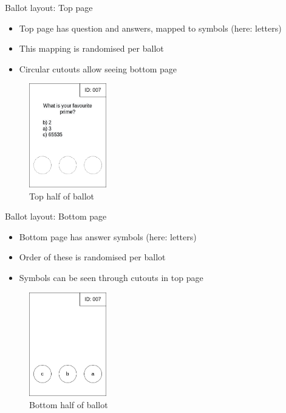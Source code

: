 \documentclass{beamer}
\begin{document}
\begin{frame}{Ballot layout: Top page}
	\begin{itemize}
		\item Top page has question and answers, mapped to symbols (here: letters)
		\item This mapping is randomised per ballot
		\item Circular cutouts allow seeing bottom page
	\end{itemize}
	\begin{figure}
		\centering
		\includegraphics[width=0.3\textwidth]{../resources/high_level_ballot_top.drawio.png}
		\caption{Top half of ballot}
	\end{figure}
\end{frame}

\begin{frame}{Ballot layout: Bottom page}
	\begin{itemize}
		\item Bottom page has answer symbols (here: letters)
		\item Order of these is randomised per ballot
		\item Symbols can be seen through cutouts in top page
	\end{itemize}
	\begin{figure}
		\centering
		\includegraphics[width=0.3\textwidth]{../resources/high_level_ballot_bottom.drawio.png}
		\caption{Bottom half of ballot}
	\end{figure}
\end{frame}
\end{document}

